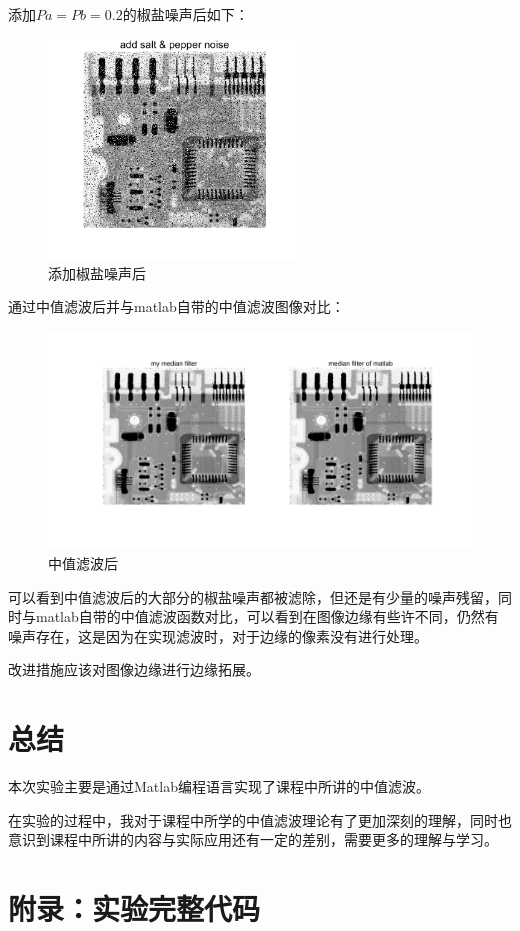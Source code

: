 \documentclass{../source/Experiment}
\begin{document}
        添加$Pa = Pb = 0.2$的椒盐噪声后如下：

        \begin{figure}[H]
            \centering
            \includegraphics[width = 0.6\textwidth]{第二次/f2.png}
            \caption{添加椒盐噪声后}
        \end{figure}

        通过中值滤波后并与matlab自带的中值滤波图像对比：
        \begin{figure}[H]
            \centering
            \includegraphics[width = 1\textwidth]{第二次/f3.png}
            \caption{中值滤波后}
        \end{figure}
        可以看到中值滤波后的大部分的椒盐噪声都被滤除，但还是有少量的噪声残留，同时与matlab自带的中值滤波函数对比，可以看到在图像边缘有些许不同，仍然有噪声存在，这是因为在实现滤波时，对于边缘的像素没有进行处理。

        改进措施应该对图像边缘进行边缘拓展。
    \section{总结}
    本次实验主要是通过Matlab编程语言实现了课程中所讲的中值滤波。
    
    在实验的过程中，我对于课程中所学的中值滤波理论有了更加深刻的理解，同时也意识到课程中所讲的内容与实际应用还有一定的差别，需要更多的理解与学习。

    \section{附录：实验完整代码}
    
    
\end{document}
